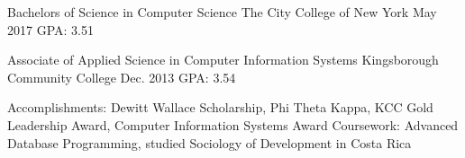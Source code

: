 \begin{cventries}
\iftrue
  \cventry
    {Bachelors of Science in Computer Science} %
    {The City College of New York} %
    {May 2017} %
    {GPA: 3.51} %
	{} %
\fi

\iftrue
  \cventry
    {Associate of Applied Science in Computer Information Systems} %
    {Kingsborough Community College} %
    {Dec. 2013} %
    {GPA: 3.54} %
    {
	  \begin{cvskills} %
		\cvskill
		  {Accomplishments:} %
		  {Dewitt Wallace Scholarship, Phi Theta Kappa, KCC Gold Leadership Award, Computer Information Systems Award} %
		\cvskill
		  {Coursework:} %
		  {Advanced Database Programming, studied Sociology of Development in Costa Rica} %
	  \end{cvskills}
	}
\fi

\iffalse
  \cventry
    {Associate of Occupational Studies in Computer Programming} %
    {Wood Tobe-Coburn School} %
    {Aug. 2008} %
    {GPA: 3.6} %
    {
	  \begin{cvskills} %
		\cvskill
		  {Coursework:} %
		  {Visual Basic for Applications, Server Administration} %
	  \end{cvskills}
	}
\fi

\end{cventries}
